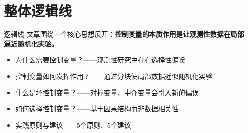 \section{整体逻辑线}

\begin{frame}{逻辑线}
文章围绕一个核心思想展开：\textbf{控制变量的本质作用是让观测性数据在局部逼近随机化实验。}
  \begin{itemize}
    \item 为什么需要控制变量？——观测性研究中存在选择性偏误
    \item 控制变量如何发挥作用？——通过分块使局部数据近似随机化实验
    \item 什么是坏控制变量？——对撞变量、中介变量会引入新的偏误
    \item 如何选择控制变量？——基于因果结构而非数据相关性
    \item 实践原则与建议——5个原则、5个建议
  \end{itemize}
\end{frame}
